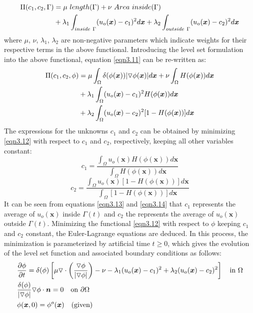 \documentclass[10pt,letterpaper, onecolumn]{article}
\begin{document}
%
%
%
\begin{align}
\Pi(c_1,c_2,\Gamma) &= \mu \  length(\Gamma) + 
\nu \  Area\ inside (\Gamma) \notag \\
& + \lambda_1 \int_{inside \ \Gamma} 
(u_o(\bm{x}) - c_1)^2 d\bm{x} 
+ \lambda_2 \int_{outside \ \Gamma} 
(u_o(\bm{x}) - c_2)^2 d\bm{x}  
\label{eqn3.11}
\end{align}
%
%
where $\mu$, $\nu$, $\lambda_1$, $\lambda_2$ are non-negative parameters which indicate weights for their respective terms in the above functional. Introducing the level set formulation into the above functional, equation 
\eqref{eqn3.11} can be re-written as:
%
%
\begin{align}
\Pi(c_1,c_2,\phi) &= \mu  \int_\Omega  \delta (\phi(\bm{x}))
\vert \triangledown \phi (\bm{x}) \vert d\bm{x} + 
\nu \int_\Omega  H (\phi(\bm{x})) d\bm{x}  \notag \\
& + \lambda_1 \int_{\Omega} 
(u_o(\bm{x}) - c_1)^2 H (\phi(\bm{x})) d\bm{x} \notag \\
& + \lambda_2 \int_{\Omega} 
(u_o(\bm{x}) - c_2)^2 [1-H (\phi(\bm{x}))] d\bm{x}  
\label{eqn3.12}
\end{align}
%
%
The expressions for the unknowns $c_1$ and $c_2$ can be obtained by minimizing \eqref{eqn3.12} with respect to $c_1$ and $c_2$, respectively, keeping all other variables constant:
%
\begin{equation}
c_1 = \frac{\int_{\Omega}  u_o(\bm{x}) H (\phi(\bm{x})) d\bm{x} }
{\int_{\Omega} H (\phi(\bm{x})) d\bm{x}}
\label{eqn3.13}
\end{equation}
%
%
\begin{equation}
c_2 = \frac{\int_{\Omega}  u_o(\bm{x}) [1-H (\phi(\bm{x}))] d\bm{x} }
{\int_{\Omega} [1-H (\phi(\bm{x}))] d\bm{x}}
\label{eqn3.14}
\end{equation}
%
It can be seen from equations \eqref{eqn3.13} and \eqref{eqn3.14} that $c_1$ represents the average of 
$u_o(\bm{x})$ inside $\Gamma(t)$ and $c_2$ the represents the average of 
$u_o(\bm{x})$ outside $\Gamma(t)$. Minimizing the functional \eqref{eqn3.12} with respect to $\phi$ keeping
$c_1$ and $c_2$ constant, the Euler-Lagrange equations are deduced. In this process, the minimization is parameterized by artificial time $t \geq 0$, which gives the evolution of the level set function and associated boundary conditions as follows:
%
\begin{align}
&\frac{\partial \phi}{\partial t} = \delta (\phi) \left[ \mu \triangledown \cdot
\left(  \frac{\triangledown \phi}{\vert \triangledown \phi \vert}  \right) - \nu - \lambda_1 (u_o(\bm{x}) - c_1)^2 + \lambda_2 (u_o(\bm{x}) - c_2)^2  \right] \quad \text{in }
\Omega \notag \\ 
& \frac{\delta (\phi)}{\vert \triangledown \phi \vert} 
\triangledown \phi \cdot \bm{n} = 0 \quad \text{on }
\partial \Omega  \notag \\
&\phi(\bm{x},0) = \phi^o(\bm{x}) \quad (\text{given})
\label{eqn3.15}
\end{align}
\end{document}
